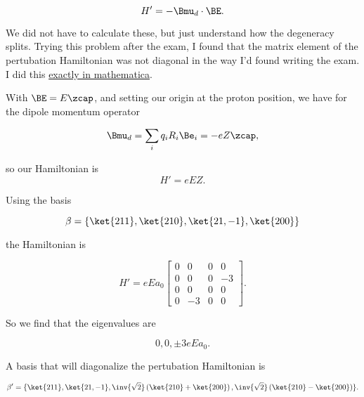 \begin{equation}\label{eqn:qmTwoExamReflection:570}
H' = -\Bmu_d \cdot \BE.
\end{equation}

We did not have to calculate these, but just understand how the degeneracy splits.  Trying this problem after the exam, I found that the matrix element of the pertubation Hamiltonian was not diagonal in the way I'd found writing the exam.  I did this \href{https://github.com/peeterjoot/physicsplay/blob/master/notes/phy456/qmTwoExamReflection.cdf}{exactly in mathematica}.

With $\BE = E \zcap$, and setting our origin at the proton position, we have for the dipole momentum operator

\begin{equation}\label{eqn:qmTwoExamReflection:590}
\Bmu_d = \sum_i q_i R_i \Be_i = - e Z \zcap,
\end{equation}

so our Hamiltonian is
\begin{equation}\label{eqn:qmTwoExamReflection:610}
H' = e E Z.
\end{equation}

Using the basis

\begin{equation}\label{eqn:qmTwoExamReflection:630}
\beta = \{ 
\ket{211}, \ket{210}, \ket{21,-1}, \ket{200}
\}
\end{equation}

the Hamiltonian is

\begin{equation}\label{eqn:qmTwoExamReflection:650}
H' = 
e E a_0
\begin{bmatrix}
 0 & 0 & 0 & 0 \\
 0 & 0 & 0 & -3 \\
 0 & 0 & 0 & 0 \\
 0 & -3 & 0 & 0 
\end{bmatrix}.
\end{equation}

So we find that the eigenvalues are

\begin{equation}\label{eqn:qmTwoExamReflection:670}
0, 0, \pm 3 e E a_0.
\end{equation}

A basis that will diagonalize the pertubation Hamiltonian is

\begin{equation}\label{eqn:qmTwoExamReflection:690}
\beta' = \{ 
\ket{211}, \ket{21,-1},
\inv{\sqrt{2}} 
\left(\ket{210}
+\ket{200}
\right),
\inv{\sqrt{2}} 
\left(\ket{210}
-\ket{200}
\right)
\}.
\end{equation}

